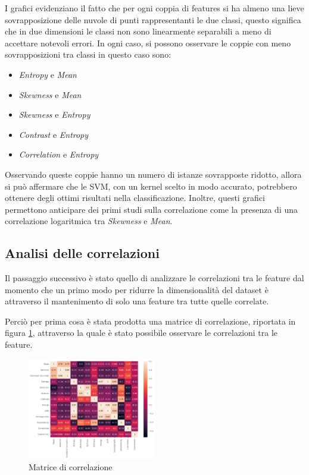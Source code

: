 I grafici evidenziano il fatto che per ogni coppia di features si ha almeno una
lieve sovrapposizione delle nuvole di punti rappresentanti le due classi, questo
significa che in due dimensioni le classi non sono linearmente separabili a meno
di accettare notevoli errori. In ogni caso, si possono osservare le coppie con
meno sovrapposizioni tra classi in questo caso sono:
\begin{itemize}
      \item \textit{Entropy} e \textit{Mean}
      \item \textit{Skewness} e \textit{Mean}
      \item \textit{Skewness} e \textit{Entropy}
      \item \textit{Contrast} e \textit{Entropy}
      \item \textit{Correlation} e \textit{Entropy}
\end{itemize}
Osservando queste coppie hanno un numero di istanze sovrapposte ridotto, allora
si può affermare che le SVM, con un kernel scelto in modo accurato, potrebbero
ottenere degli ottimi risultati nella classificazione. Inoltre, questi grafici
permettono anticipare dei primi studi sulla correlazione come la presenza di una
correlazione logaritmica tra \textit{Skewness} e \textit{Mean}.
\subsection{Analisi delle correlazioni} \label{sec:correlazione}
Il passaggio successivo è  stato quello di analizzare le correlazioni tra le
feature dal momento che un primo modo per ridurre la dimensionalità del dataset
è attraverso il mantenimento di solo una feature tra tutte quelle correlate.

Perciò per prima cosa è stata prodotta una matrice di correlazione, riportata in
figura \ref{fig:corr-matrix}, attraverso la quale è stato possibile osservare le
correlazioni tra le feature.

\begin{figure}[!ht]
      \centering
      \includegraphics[width=0.5\textwidth]{img/analisi/corr.png}
      \caption{Matrice di correlazione}
      \label{fig:corr-matrix}
\end{figure}

